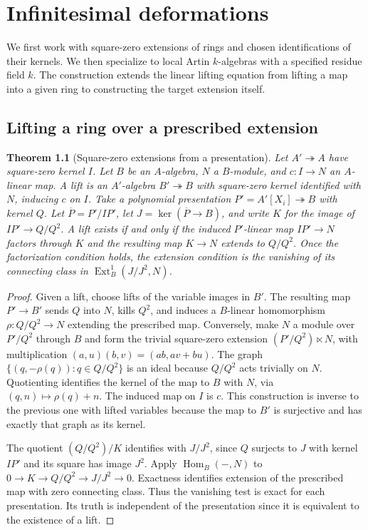 \documentclass[11pt,oneside,openany]{book}
\newtheorem{theorem}{Theorem}[chapter]
\theoremstyle{definition}
\theoremstyle{remark}
\begin{document}
\chapter{Infinitesimal deformations}
\label{ch:deformations}

We first work with square-zero extensions of rings and chosen
identifications of their kernels. We then specialize to local Artin
\(k\)-algebras with a specified residue field \(k\).
The construction extends the linear lifting equation
\cite[FL-06]{core} from lifting a map into a given ring to
constructing the target extension itself.

\section{Lifting a ring over a prescribed extension}

\begin{theorem}[Square-zero extensions from a presentation]\label{res:T01}
Let \(A'\twoheadrightarrow A\) have square-zero kernel \(I\).
Let \(B\) be an \(A\)-algebra, \(N\) a \(B\)-module, and \(c:I\to N\)
an \(A\)-linear map. A lift is an \(A'\)-algebra \(B'\twoheadrightarrow B\)
with square-zero kernel identified with \(N\), inducing \(c\) on \(I\).
Take a polynomial presentation \(P'=A'[X_i]\twoheadrightarrow B\)
with kernel \(Q\). Let \(\overline P=P'/IP'\), let
\(J=\ker(\overline P\to B)\), and write \(K\) for the image of
\(IP'\to Q/Q^2\).
A lift exists if and only if the induced \(P'\)-linear map
\(IP'\to N\) factors through \(K\) and the resulting map
\(K\to N\) extends to \(Q/Q^2\). Once the factorization condition
holds, the extension condition is the vanishing of its connecting
class in \(\operatorname{Ext}^1_B(J/J^2,N)\).
\end{theorem}
\begin{proof}
Given a lift, choose lifts of the variable images in \(B'\).
The resulting map \(P'\to B'\) sends \(Q\) into \(N\), kills
\(Q^2\), and induces a \(B\)-linear homomorphism \(\rho:Q/Q^2\to N\)
extending the prescribed map. Conversely, make
\(N\) a module over \(P'/Q^2\) through \(B\) and form the trivial
square-zero extension \((P'/Q^2)\ltimes N\), with multiplication
\((a,u)(b,v)=(ab,av+bu)\).
The graph \(\{(q,-\rho(q)):q\in Q/Q^2\}\) is an ideal because
\(Q/Q^2\) acts trivially on \(N\). Quotienting identifies the kernel
of the map to \(B\) with \(N\), via \((q,n)\mapsto\rho(q)+n\).
The induced map on \(I\) is \(c\). This construction is inverse
to the previous one with lifted variables because the map to \(B'\)
is surjective and has exactly that graph as its kernel.

The quotient \((Q/Q^2)/K\) identifies with \(J/J^2\), since \(Q\)
surjects to \(J\) with kernel \(IP'\) and its square has image \(J^2\).
Apply \(\operatorname{Hom}_B(-,N)\) to
\(0\to K\to Q/Q^2\to J/J^2\to0\).
Exactness identifies extension of the prescribed map with zero
connecting class. Thus the vanishing test is exact for each
presentation. Its truth is independent of the presentation since
it is equivalent to the existence of a lift.
\end{proof}
\end{document}
